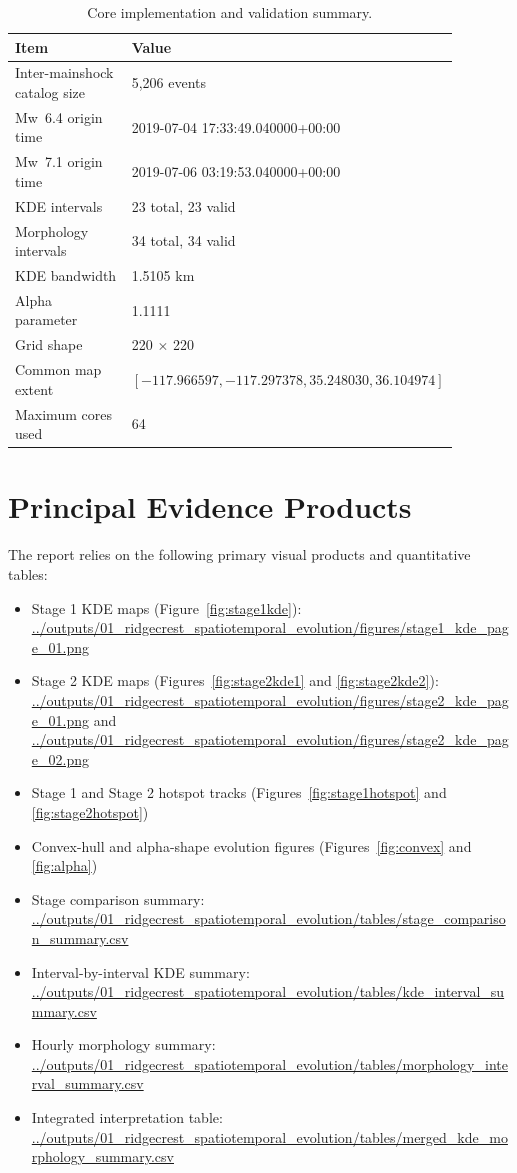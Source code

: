 \documentclass[11pt]{article}
\begin{document}
\begin{table}[H]
\centering
\caption{Core implementation and validation summary.}
\label{tab:workflow}
\begin{tabular}{p{0.42\linewidth}p{0.46\linewidth}}
\toprule
Item & Value \\
\midrule
Inter-mainshock catalog size & 5,206 events \\
Mw~6.4 origin time & 2019-07-04 17:33:49.040000+00:00 \\
Mw~7.1 origin time & 2019-07-06 03:19:53.040000+00:00 \\
KDE intervals & 23 total, 23 valid \\
Morphology intervals & 34 total, 34 valid \\
KDE bandwidth & 1.5105 km \\
Alpha parameter & 1.1111 \\
Grid shape & 220 $\times$ 220 \\
Common map extent & $[-117.966597, -117.297378, 35.248030, 36.104974]$ \\
Maximum cores used & 64 \\
\bottomrule
\end{tabular}
\end{table}

\section{Principal Evidence Products}
The report relies on the following primary visual products and quantitative tables:
\begin{itemize}[leftmargin=2em]
    \item Stage 1 KDE maps (Figure~\ref{fig:stage1kde}): \url{../outputs/01_ridgecrest_spatiotemporal_evolution/figures/stage1_kde_page_01.png}
    \item Stage 2 KDE maps (Figures~\ref{fig:stage2kde1} and \ref{fig:stage2kde2}): \url{../outputs/01_ridgecrest_spatiotemporal_evolution/figures/stage2_kde_page_01.png} and \url{../outputs/01_ridgecrest_spatiotemporal_evolution/figures/stage2_kde_page_02.png}
    \item Stage 1 and Stage 2 hotspot tracks (Figures~\ref{fig:stage1hotspot} and \ref{fig:stage2hotspot})
    \item Convex-hull and alpha-shape evolution figures (Figures~\ref{fig:convex} and \ref{fig:alpha})
    \item Stage comparison summary: \url{../outputs/01_ridgecrest_spatiotemporal_evolution/tables/stage_comparison_summary.csv}
    \item Interval-by-interval KDE summary: \url{../outputs/01_ridgecrest_spatiotemporal_evolution/tables/kde_interval_summary.csv}
    \item Hourly morphology summary: \url{../outputs/01_ridgecrest_spatiotemporal_evolution/tables/morphology_interval_summary.csv}
    \item Integrated interpretation table: \url{../outputs/01_ridgecrest_spatiotemporal_evolution/tables/merged_kde_morphology_summary.csv}
\end{itemize}
\end{document}
